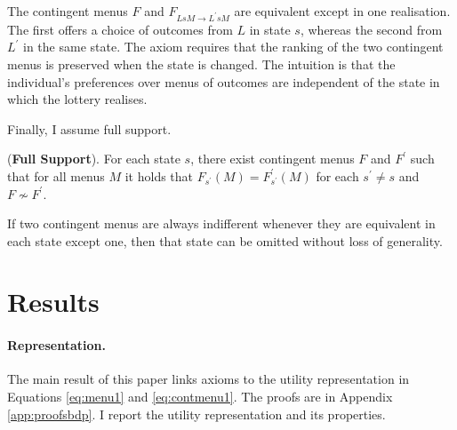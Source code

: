 The contingent menus \( F \) and \( F_{L s M \rightarrow L^{\prime} s M} \) are equivalent except in one realisation. The first offers a choice of outcomes from \( L \) in state \( s \), whereas the second from \( L^{\prime} \) in the same state. The axiom requires that the ranking of the two contingent menus is preserved when the state is changed. The intuition is that the individual's preferences over menus of outcomes are independent of the state in which the lottery realises.

Finally, I assume full support.

\begin{axiom}\label{ax:support}

	(\textbf{\textbf{Full Support}}). For each state \(s\), there exist contingent menus \(F \) and \(F^{\prime}\) such that for all menus \( M \) it holds that \(F_{s^{\prime}} \left( M \right) =F^{\prime}_{s^{\prime}} \left( M \right)\) for each \(s^{\prime} \neq s \) and \(F \nsim F^{\prime}\).

\end{axiom}

If two contingent menus are always indifferent whenever they are equivalent in each state except one, then that state can be omitted without loss of generality.

\section{Results}\label{sec:result}

\paragraph{Representation.} The main result of this paper links axioms to the utility representation in Equations \eqref{eq:menu1} and \eqref{eq:contmenu1}. The proofs are in Appendix \ref{app:proofsbdp}. I report the utility representation and its properties.

